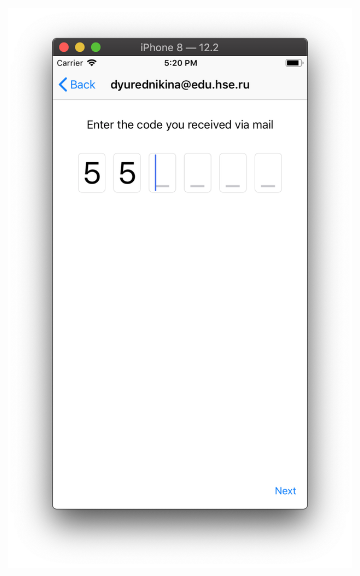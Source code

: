 \documentclass[a4paper,12pt]{article}
\begin{document}
\begin{figure}[h!]
\begin{subfigure}[b]{0.3\linewidth}
		\end{subfigure}
		\begin{subfigure}[b]{0.3\linewidth}
			\includegraphics[width=\linewidth]{../includes/pmi/code1.png}
		\end{subfigure}
		\begin{subfigure}[b]{0.3\linewidth}

\end{subfigure}
\end{figure}
\end{document}
